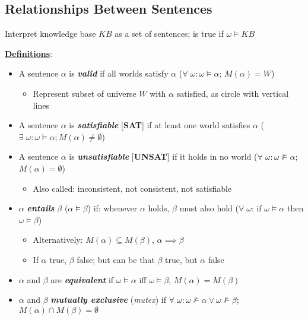 \documentclass[12pt]{extarticle}
\theoremstyle{definition}
\theoremstyle{remark}
\newcommand{\pstart}[0]{\noindent}
\newcommand{\term}[1]{\noindent\textbf{\textit{#1}}}
\newcommand{\titleul}[1]{\noindent \textbf{\ul{#1}}}
\begin{document}
\pagebreak
\subsection{Relationships Between Sentences}
\pstart
Interpret knowledge base $KB$ as a set of sentences; is true if $\omega\models KB$

\begin{tcolorbox}[colback=purple!10!white]
    \titleul{Definitions}: \begin{itemize}
        \item A sentence $\alpha$ is \term{valid} if all worlds satisfy $\alpha$ ($\forall\;\omega:\omega\models\alpha$; $M(\alpha)=W$) \begin{itemize}
            \item Represent subset of universe $W$ with $\alpha$ satisfied, as circle with vertical lines
        \end{itemize}
        \item A sentence $\alpha$ is \term {satisfiable} [\textbf{SAT}] if at least one world satisfies $\alpha$ ($\exists\;\omega:\omega\models\alpha;M(\alpha)\neq\emptyset$)
        \item A sentence $\alpha$ is \term{unsatisfiable} [\textbf{UNSAT}] if it holds in no world ($\forall\;\omega:\omega\not\models\alpha$; $M(\alpha)=\emptyset$) \begin{itemize}
            \item Also called: inconsistent, not consistent, not satisfiable
        \end{itemize}
        \item $\alpha$ \term{entails} $\beta$ ($\alpha\models\beta$) if: whenever $\alpha$ holds, $\beta$ must also hold ($\forall\;\omega$: if $\omega\models\alpha$ then $\omega\models\beta$) \begin{itemize}
            \item Alternatively: $M(\alpha)\subseteq M(\beta)$, $\alpha\implies\beta$
            \item If $\alpha$ true, $\beta$ false; but can be that $\beta$ true, but $\alpha$ false
        \end{itemize}
        \item $\alpha$ and $\beta$ are \term{equivalent} if $\omega\models\alpha$ iff $\omega\models\beta$, $M(\alpha)=M(\beta)$
        \item $\alpha$ and $\beta$ \term{mutually exclusive} (\textit{mutex}) if $\forall\;\omega:\omega\not\models\alpha\lor\omega\not\models\beta$; $M(\alpha)\cap M(\beta)=\emptyset$
    \end{itemize}
\end{tcolorbox}
\end{document}
